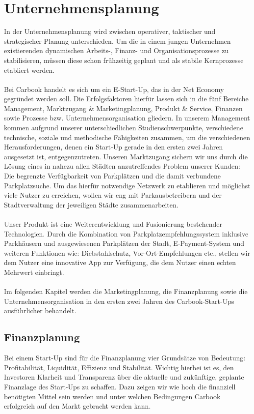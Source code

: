 \documentclass[12pt,ngerman, fleqn]{book} %
\begin{document}
\chapter{Unternehmensplanung}
In der Unternehmensplanung wird zwischen operativer, taktischer und strategischer Planung unterschieden. Um die in einem jungen Unternehmen existierenden dynamischen Arbeits-, Finanz- und Organisationsprozesse zu stabilisieren, müssen diese schon frühzeitig geplant und als stabile Kernprozesse etabliert werden\autocite{koll}.\\ \\
Bei Carbook handelt es sich um ein E-Start-Up, das in der Net Economy gegründet werden soll. Die Erfolgsfaktoren hierfür lassen sich in die fünf Bereiche Management, Marktzugang & Marketingplanung, Produkt & Service, Finanzen sowie Prozesse bzw. Unternehmensorganisation gliedern\autocite{koll,mcdo}. In unserem Management kommen aufgrund unserer unterschiedlichen Studienschwerpunkte, verschiedene technische, soziale und methodische Fähigkeiten zusammen, um die verschiedenen Herausforderungen, denen ein Start-Up gerade in den ersten zwei Jahren ausgesetzt ist, entgegenzutreten.
Unseren Marktzugang sichern wir uns durch die Lösung eines in nahezu allen Städten anzutreffendes Problem unserer Kunden: Die begrenzte Verfügbarkeit von Parkplätzen und die damit verbundene Parkplatzsuche. Um das hierfür notwendige Netzwerk zu etablieren und möglichst viele Nutzer zu erreichen, wollen wir eng mit Parkausbetreibern und der Stadtverwaltung der jeweiligen Städte zusammenarbeiten. \\ \\
Unser Produkt ist eine Weiterentwicklung und Fusionierung bestehender Technologien. Durch die Kombination von Parkplatzempfehlungssystem inklusive Parkhäusern und ausgewiesenen Parkplätzen der Stadt, E-Payment-System und weiteren Funktionen wie: Diebstahlschutz, Vor-Ort-Empfehlungen etc., stellen wir dem Nutzer eine innovative App zur Verfügung, die dem Nutzer einen echten Mehrwert einbringt. \\ \\
Im folgenden Kapitel werden die Marketingplanung, die Finanzplanung sowie die Unternehmensorganisation in den ersten zwei Jahren des Carbook-Start-Ups ausführlicher behandelt.

\section{Finanzplanung} 
Bei einem Start-Up sind für die Finanzplanung vier Grundsätze von Bedeutung: Profitabilität, Liquidität, Effizienz und Stabilität\autocite{barr}. Wichtig hierbei ist es, den Investoren Klarheit und Transparenz über die aktuelle und zukünftige, geplante Finanzlage des Start-Ups zu schaffen. Dazu zeigen wir wie hoch die finanziell benötigten Mittel sein werden und unter welchen Bedingungen Carbook erfolgreich auf den Markt gebracht werden kann.
\end{document}
